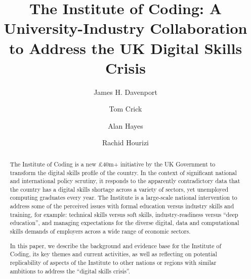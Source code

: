 \documentclass[sigconf,anonymous]{acmart}
\begin{document}
\title{The Institute of Coding: A University-Industry Collaboration to Address the UK Digital Skills Crisis}
\author{James H. Davenport}

\author{Tom Crick}

\author{Alan Hayes}

\author{Rachid Hourizi}
 

\renewcommand{\shortauthors}{Davenport, Crick, Hayes and Hourizi}


\begin{abstract}
The Institute of Coding is a new \pounds40m+ initiative by the UK
Government to transform the digital skills profile of the country. In
the context of significant national and international policy scrutiny, 
it responds to the apparently contradictory data that
the country has a digital skills shortage across a variety of sectors,
yet unemployed computing graduates every year. The Institute is a
large-scale national intervention to address some of the perceived
issues with formal education versus industry skills and training, for
example: technical skills versus soft skills, industry-readiness
versus ``deep education'', and managing expectations for the diverse
digital, data and computational skills demands of employers across a
wide range of economic sectors.


In this paper, we describe the background and evidence base for the
Institute of Coding, its key themes and current activities, as
well as reflecting on potential replicability of aspects of the
Institute to other nations or regions with similar ambitions to
address the ``digital skills crisis''.
\end{abstract}
\end{document}
